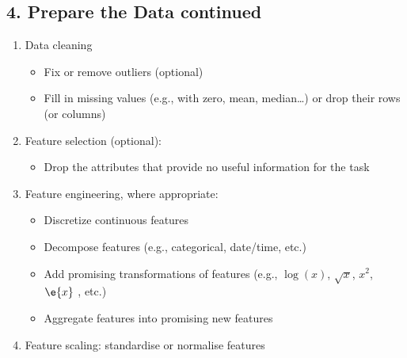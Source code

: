\begin{slide}
\section[-2]{4. Prepare the Data continued}

\begin{PauseHighLight}\squeeze
  \begin{enumerate}
  \item Data cleaning
    \begin{itemize}
    \item Fix or remove outliers (optional)
    \item Fill in missing values (e.g., with zero, mean, median…) or
      drop their rows (or columns)\pause
    \end{itemize}
  \item Feature selection (optional):
    \begin{itemize}
    \item Drop the attributes that provide no useful information for
      the task\pause
    \end{itemize}
  \item Feature engineering, where appropriate:
    \begin{itemize}
    \item Discretize continuous features
    \item Decompose features (e.g., categorical, date/time, etc.)
    \item Add promising transformations of features (e.g., $\log(x)$,
      $\sqrt{x}$, $x^2$, $\e{x}$ , etc.)\pause
    \item Aggregate features into promising new features\pause
    \end{itemize}
  \item Feature scaling: standardise or normalise features\pause
  \end{enumerate}
\end{PauseHighLight}


\end{slide}



